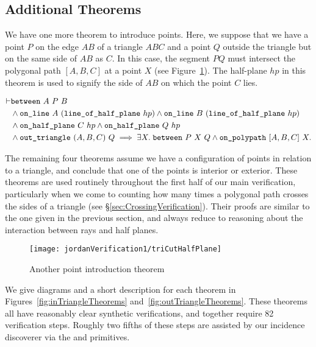 \subsection{Additional Theorems}\label{sec:AdditionalTheorems}
We have one more theorem to introduce points. Here, we suppose that we have a point $P$ on the edge $AB$ of a triangle $ABC$ and a point $Q$ outside the triangle but on the same side of $AB$ as $C$. In this case, the segment $PQ$ must intersect the polygonal path $[A,B,C]$ at a point $X$ (see Figure~\ref{fig:triCutHalfPlane}). The half-plane $hp$ in this theorem is used to signify the side of $AB$ on which the point $C$ lies.

\begin{equation}\label{eq:triCutHalfPlane}
\begin{split}
\vdash&\between{A}{P}{B}\\
&\wedge \code{on\_line}\ A\ (\code{line\_of\_half\_plane}\ hp) \wedge \code{on\_line}\ B\ (\code{line\_of\_half\_plane}\ hp)\\
&\wedge \code{on\_half\_plane}\ C\ hp \wedge \code{on\_half\_plane}\ Q\ hp\\
&\wedge \code{out\_triangle}\ (A,B,C)\ Q\implies \exists X.\; \between{P}{X}{Q} \wedge \code{on\_polypath}\ [A,B,C]\ X.
\end{split}
\end{equation}

The remaining four theorems assume we have a configuration of points in relation to a triangle, and conclude that one of the points is interior or exterior. These theorems are used routinely throughout the first half of our main verification, particularly when we come to counting how many times a polygonal path crosses the sides of a triangle (see \S\ref{sec:CrossingVerification}). Their proofs are similar to the one given in the previous section, and always reduce to reasoning about the interaction between rays and half planes.

\begin{figure}
\centering
\texttt{[image: jordanVerification1/triCutHalfPlane]}
\caption{Another point introduction theorem}
\label{fig:triCutHalfPlane}
\end{figure}

We give diagrams and a short description for each theorem in Figures~\ref{fig:inTriangleTheorems} and~\ref{fig:outTriangleTheorems}. These theorems all have reasonably clear synthetic verifications, and together require 82 verification steps. Roughly two fifths of these steps are assisted by our incidence discoverer via the  and  primitives.

